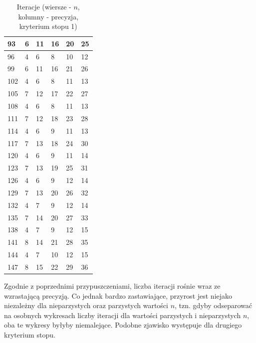 \documentclass{article}
\begin{document}
\begin{table}[H]
\begin{tabular}{|l|l|l|l|l|l|}
93 & 6 & 11 & 16 & 20 & 25 \\ \hline
96 & 4 & 6 & 8 & 10 & 12 \\ \hline
99 & 6 & 11 & 16 & 21 & 26 \\ \hline
102 & 4 & 6 & 8 & 11 & 13 \\ \hline
105 & 7 & 12 & 17 & 22 & 27 \\ \hline
108 & 4 & 6 & 8 & 11 & 13 \\ \hline
111 & 7 & 12 & 18 & 23 & 28 \\ \hline
114 & 4 & 6 & 9 & 11 & 13 \\ \hline
117 & 7 & 13 & 18 & 24 & 30 \\ \hline
120 & 4 & 6 & 9 & 11 & 14 \\ \hline
123 & 7 & 13 & 19 & 25 & 31 \\ \hline
126 & 4 & 6 & 9 & 12 & 14 \\ \hline
129 & 7 & 13 & 20 & 26 & 32 \\ \hline
132 & 4 & 7 & 9 & 12 & 14 \\ \hline
135 & 7 & 14 & 20 & 27 & 33 \\ \hline
138 & 4 & 7 & 9 & 12 & 15 \\ \hline
141 & 8 & 14 & 21 & 28 & 35 \\ \hline
144 & 4 & 7 & 10 & 12 & 15 \\ \hline
147 & 8 & 15 & 22 & 29 & 36 \\ \hline
\end{tabular}
\caption{Iteracje (wiersze - $n$, kolumny - precyzja, kryterium stopu 1)}
\end{table}

Zgodnie z poprzednimi przypuszczeniami, liczba iteracji rośnie wraz ze wzrastającą precyzją. Co jednak bardzo zastawiające, 
przyrost jest niejako niezależny dla nieparzystych oraz parzystych wartości $n$, tzn. gdyby odseparować na osobnych wykresach
liczby iteracji dla wartości parzystych i nieparzystych $n$, oba te wykresy byłyby niemalejące. Podobne zjawisko występuje
dla drugiego kryterium stopu.
\end{document}
